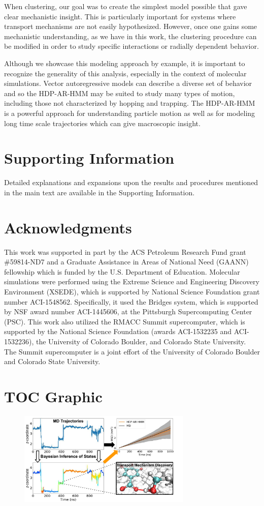 \documentclass[journal=jpcbfk,manuscript=article]{achemso}
\begin{document}
  When clustering, our goal was to create the simplest model possible that gave
  clear mechanistic insight. This is particularly important for systems where transport mechanisms
  are not easily hypothesized. However, once one gains some mechanistic understanding,
  as we have in this work, the clustering procedure can be modified in order to 
  study specific interactions or radially dependent behavior.
  
  Although we showcase this modeling approach by example, it is important to
  recognize the generality of this analysis, especially in the context of molecular
  simulations. Vector autoregressive models can describe a diverse set of behavior
  and so the HDP-AR-HMM may be suited to study many types of motion, including those not 
  characterized by hopping and trapping. The HDP-AR-HMM is a powerful approach for 
  understanding particle motion as well as for modeling long time scale trajectories
  which can give macroscopic insight.
  
  \section*{Supporting Information}

  Detailed explanations and expansions upon the results and procedures mentioned in
  the main text are available in the Supporting Information. 

  \section*{Acknowledgments}

  This work was supported in part by the ACS Petroleum Research Fund
  grant \#59814-ND7 and a Graduate Assistance in Areas of National Need (GAANN) 
  fellowship which is funded by the U.S. Department of Education. 
  Molecular simulations were performed using the Extreme Science and
  Engineering Discovery Environment (XSEDE), which is supported by National
  Science Foundation grant number ACI-1548562. Specifically, it used the Bridges
  system, which is supported by NSF award number ACI-1445606, at the Pittsburgh
  Supercomputing Center (PSC). This work also utilized the RMACC Summit supercomputer,
  which is supported by the National Science Foundation (awards ACI-1532235 and
  ACI-1532236), the University of Colorado Boulder, and Colorado State
  University. The Summit supercomputer is a joint effort of the University of
  Colorado Boulder and Colorado State University.

  \clearpage

  
  
  \newpage

  \section*{TOC Graphic}
  
  \begin{figure}[!htb]
  \centering
  \includegraphics[width=3.25in]{hdphmm_TOC_v2.pdf}
  \end{figure}
\end{document}

